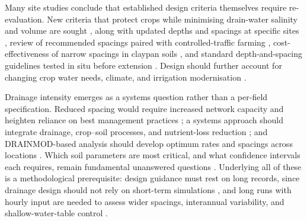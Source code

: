 \documentclass[11pt]{article}
\begin{document}
Many site studies conclude that established design criteria themselves require
re-evaluation. New criteria that protect crops while minimising drain-water
salinity and volume are sought \parencite{Christen2001}, along with updated
depths and spacings at specific sites
\parencite{Muhammad2021,Malota2016,Bahçeci2009,Kahlown2002}, review of
recommended spacings paired with controlled-traffic farming
\parencite{Mante2022,Mante2018}, cost-effectiveness of narrow spacings in
claypan soils \parencite{Nelson2017}, and standard depth-and-spacing guidelines
tested in situ before extension \parencite{HajAmor2019}. Design should further
account for changing crop water needs, climate, and irrigation modernisation
\parencite{Rui2024,Akram2013,Ziaeifar2025,Ritzema2023,Ritzema2007,Ritzema2006,Ritzema2011}.

Drainage intensity emerges as a systems question rather than a per-field
specification. Reduced spacing would require increased network capacity and
heighten reliance on best management practices
\parencite{Singh2009,Dialameh2025}; a systems approach should integrate
drainage, crop--soil processes, and nutrient-loss reduction
\parencite{Castellano2019}; and DRAINMOD-based analysis should develop optimum
rates and spacings across locations \parencite{Strock2011}. Which soil
parameters are most critical, and what confidence intervals each requires,
remain fundamental unanswered questions
\parencite{Ayars2015,SHIRMOHAMMADI1995,HARDJOAMIDJOJO1982}. Underlying all of
these is a methodological prerequisite: design guidance must rest on long
records, since drainage design should not rely on short-term simulations
\parencite{Wang2006b}, and long runs with hourly input are needed to assess
wider spacings, interannual variability, and shallow-water-table control
\parencite{Ale2009,Häggblom2019,Malota2015,Salo2019,Kladivko2023,Chang2012}.

\printbibliography
\end{document}
